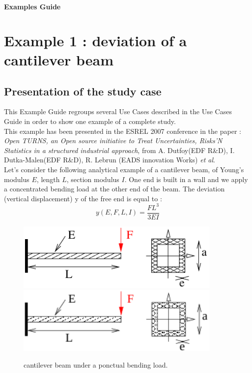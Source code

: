 \documentclass[11pt]{article}
\begin{document}
\begin{titlepage}
  \vspace*{2cm}
  \begin{center}
    {\huge \bf Examples Guide}
    
  \end{center}

\end{titlepage}
\newpage
\tableofcontents


\newpage
\section{Example 1 : deviation of a cantilever beam}

\subsection{Presentation of the study case}

This Example Guide regroups several Use Cases described in the Use Cases Guide in order to show one example of a complete study. \\

This example has been presented in the ESREL 2007 conference in the paper : {\itshape Open TURNS, an Open source initiative to Treat Uncertainties, Risks'N Statistics in a structured industrial approach}, from A. Dutfoy(EDF R\&D), I. Dutka-Malen(EDF R\&D), R. Lebrun (EADS innovation Works) \emph{et al}.\\

Let's consider the following analytical example of a cantilever beam, of Young's modulus $E$, length $L$, section modulus $I$. One end is built in a wall and we apply a concentrated bending load at the other end of the beam. The deviation (vertical displacement) y of the free end is equal to :
$$
y(E, F, L, I) = \frac{FL^3}{3EI}
$$

\begin{figure}[Hhbtp]
  \begin{center}
    \ifpdf
    \includegraphics[width=10cm]{poutre.pdf}
    \else
    \includegraphics[width=10cm]{poutre.png}
    \fi
  \end{center}
  \caption{cantilever beam under a ponctual bending load.}
\end{figure}
\end{document}
